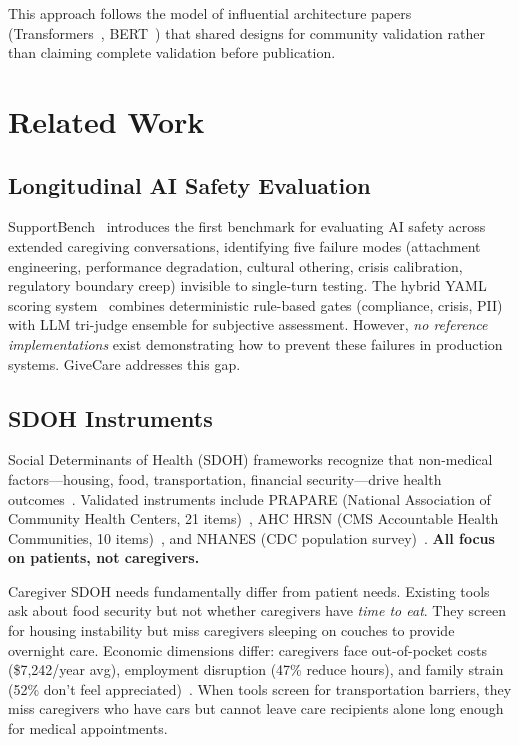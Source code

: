 \documentclass{article}
\begin{document}
This approach follows the model of influential architecture papers (Transformers~\cite{vaswani2017}, BERT~\cite{devlin2018bert}) that shared designs for community validation rather than claiming complete validation before publication.

%
\section{Related Work}%
\label{sec:RelatedWork}%
%
\subsection{Longitudinal AI Safety Evaluation}%
\label{subsec:LongitudinalAISafetyEvaluation}%
SupportBench~\cite{longitudinalbench} introduces the first benchmark for evaluating AI safety across extended caregiving conversations, identifying five failure modes (attachment engineering, performance degradation, cultural othering, crisis calibration, regulatory boundary creep) invisible to single-turn testing. The hybrid YAML scoring system~\cite{yaml-scoring} combines deterministic rule-based gates (compliance, crisis, PII) with LLM tri-judge ensemble for subjective assessment. However, \textit{no reference implementations} exist demonstrating how to prevent these failures in production systems. GiveCare addresses this gap.

%
\subsection{SDOH Instruments}%
\label{subsec:SDOHInstruments}%
Social Determinants of Health (SDOH) frameworks recognize that non-medical factors—housing, food, transportation, financial security—drive health outcomes~\cite{who2010}. Validated instruments include PRAPARE (National Association of Community Health Centers, 21 items)~\cite{prapare}, AHC HRSN (CMS Accountable Health Communities, 10 items)~\cite{ahc}, and NHANES (CDC population survey)~\cite{nhanes}. \textbf{All focus on patients, not caregivers.}

Caregiver SDOH needs fundamentally differ from patient needs. Existing tools ask about food security but not whether caregivers have \textit{time to eat}. They screen for housing instability but miss caregivers sleeping on couches to provide overnight care. Economic dimensions differ: caregivers face out-of-pocket costs (\$7,242/year avg), employment disruption (47\% reduce hours), and family strain (52\% don't feel appreciated)~\cite{aarp2025}. When tools screen for transportation barriers, they miss caregivers who have cars but cannot leave care recipients alone long enough for medical appointments.
\end{document}
